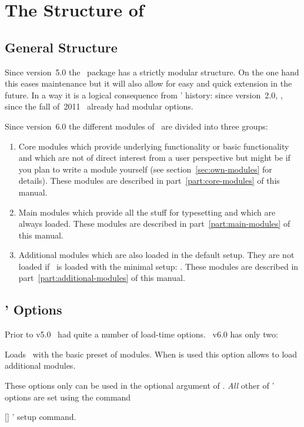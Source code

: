 \documentclass{chemmacros-manual}
\begin{document}
\section{The Structure of \chemmacros}\label{sec:structure-chemmacros}
\subsection{General Structure}
Since version~5.0 the \chemmacros\ package has a strictly modular
structure.  On the one hand this eases maintenance but it
will also allow for easy and quick extension in the future.  In a way it is a
logical consequence from \chemmacros' history: since version~2.0, \ie, since
the fall of~2011 \chemmacros\ already had modular options.

Since version~6.0 the different modules of \chemmacros\ are divided into three
groups:
\begin{enumerate}
  \item Core modules which provide underlying functionality or basic
    functionality and which are not of direct interest from a user perspective
    but might be if you plan to write a module yourself (see
    section~\ref{sec:own-modules} for details).  These modules are described in
    part~\ref{part:core-modules} of this manual.
  \item Main modules which provide all the stuff for typesetting and which are
    always loaded.  These modules are described in
    part~\ref{part:main-modules} of this manual.
  \item Additional modules which are also loaded in the default setup. They
    are not loaded if \chemmacros\ is loaded with the minimal setup:
    .  These modules are described in
    part~\ref{part:additional-modules} of this manual.
\end{enumerate}

\subsection{\chemmacros' Options}\label{sec:using-chemm-opti}
Prior to v5.0 \chemmacros\ had quite a number of load-time options.
\chemmacros\ v6.0 has only two:
\begin{options}
    Loads \chemmacros\ with the basic preset of modules.
  \Initial
    When  is used this option allows to load additional
    modules.
\end{options}
These options only can be used in the optional argument of
. \emph{All} other of \chemmacros' options are set using the
command
\begin{commands}
  []
    \chemmacros' setup command.
\end{commands}
\end{document}
